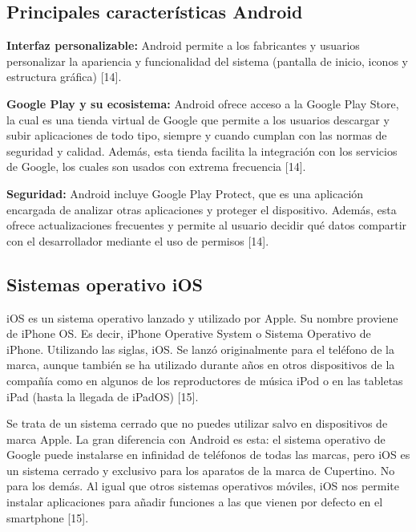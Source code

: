 \subsection{Principales características Android}

    \begin{list}{}%
    {\setlength{\leftmargin}{1cm}%
     \setlength{\rightmargin}{1cm}%
     \setlength{\itemsep}{0.5\baselineskip}%
     \setlength{\parsep}{0pt}}
     
    \item\relax
    \small
    \textbf{Interfaz personalizable:} Android permite a los fabricantes y usuarios personalizar la apariencia y funcionalidad del sistema (pantalla de inicio, iconos y estructura gráfica) [14]. 
    
    \item\relax
    \small
    \textbf{Google Play y su ecosistema:} Android ofrece acceso a la Google Play Store, la cual es una tienda virtual de Google que permite a los usuarios descargar y subir aplicaciones de todo tipo, siempre y cuando cumplan con las normas de seguridad y calidad. Además, esta tienda facilita la integración con los servicios de Google, los cuales son usados con extrema frecuencia [14].
    
    \item\relax
    \small
    \textbf{Seguridad:} Android incluye Google Play Protect, que es una aplicación encargada de analizar otras aplicaciones y proteger el dispositivo. Además, esta ofrece actualizaciones frecuentes y permite al usuario decidir qué datos compartir con el desarrollador mediante el uso de permisos [14].
    
    \end{list}

\subsection{Sistemas operativo iOS}

\begin{list}{}%
    {\setlength{\leftmargin}{1cm}\setlength{\rightmargin}{1cm}}
    \item\relax
    \small
    iOS es un sistema operativo lanzado y utilizado por Apple. Su nombre proviene de iPhone OS. Es decir, iPhone Operative System o Sistema Operativo de iPhone. Utilizando las siglas, iOS. Se lanzó originalmente para el teléfono de la marca, aunque también se ha utilizado durante años en otros dispositivos de la compañía como en algunos de los reproductores de música iPod o en las tabletas iPad (hasta la llegada de iPadOS) [15].

    Se trata de un sistema cerrado que no puedes utilizar salvo en dispositivos de marca Apple. La gran diferencia con Android es esta: el sistema operativo de Google puede instalarse en infinidad de teléfonos de todas las marcas, pero iOS es un sistema cerrado y exclusivo para los aparatos de la marca de Cupertino. No para los demás. Al igual que otros sistemas operativos móviles, iOS nos permite instalar aplicaciones para añadir funciones a las que vienen por defecto en el smartphone [15].

\end{list}
    
